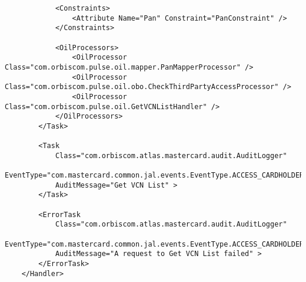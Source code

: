 \documentclass[a4paper, 11pt, titlepage]{article}
\begin{document}
\begin{itemize}
\begin{verbatim}
            <Constraints>
                <Attribute Name="Pan" Constraint="PanConstraint" />
            </Constraints>

            <OilProcessors>
                <OilProcessor Class="com.orbiscom.pulse.oil.mapper.PanMapperProcessor" />
                <OilProcessor Class="com.orbiscom.pulse.oil.obo.CheckThirdPartyAccessProcessor" />
                <OilProcessor Class="com.orbiscom.pulse.oil.GetVCNListHandler" />
            </OilProcessors>
        </Task>

        <Task
            Class="com.orbiscom.atlas.mastercard.audit.AuditLogger"
            EventType="com.mastercard.common.jal.events.EventType.ACCESS_CARDHOLDER_DATA"
            AuditMessage="Get VCN List" >
        </Task>
        
        <ErrorTask
            Class="com.orbiscom.atlas.mastercard.audit.AuditLogger"
            EventType="com.mastercard.common.jal.events.EventType.ACCESS_CARDHOLDER_DATA"
            AuditMessage="A request to Get VCN List failed" >
        </ErrorTask>
    </Handler>


\end{verbatim}
\end{itemize}
\end{document}
